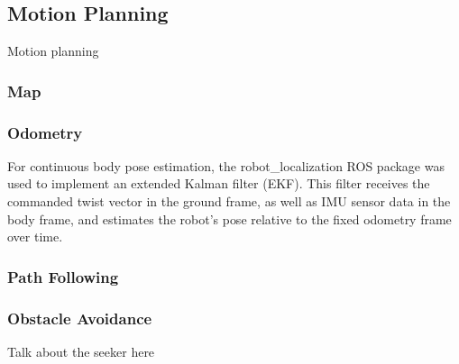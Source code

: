 \subsection{ Motion Planning }

Motion planning

\subsubsection { Map }

\subsubsection { Odometry }

For continuous body pose estimation, the robot\_localization ROS package \cite{robotlocalization} was used to implement an extended Kalman filter (EKF). This filter receives the commanded twist vector in the ground frame, as well as IMU sensor data in the body frame, and estimates the robot's pose relative to the fixed odometry frame over time.

\subsubsection { Path Following }

\subsubsection { Obstacle Avoidance }

Talk about the seeker here